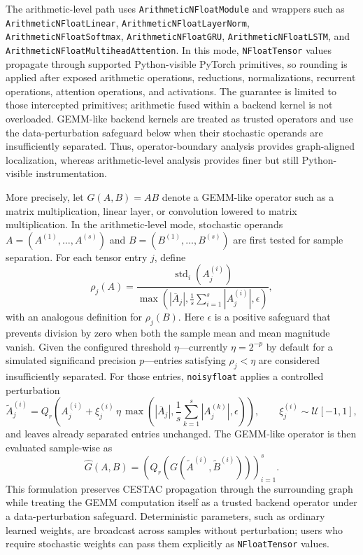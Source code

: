 \documentclass[manuscript, screen]{acmart}
\begin{document}
The arithmetic-level path uses \texttt{ArithmeticNFloatModule} and wrappers such as \texttt{ArithmeticNFloatLinear}, \texttt{ArithmeticNFloatLayerNorm}, \texttt{ArithmeticNFloatSoftmax}, \texttt{ArithmeticNFloatGRU}, \texttt{ArithmeticNFloatLSTM}, and \texttt{ArithmeticNFloatMultiheadAttention}. In this mode, \texttt{NFloatTensor} values propagate through supported Python-visible PyTorch primitives, so rounding is applied after exposed arithmetic operations, reductions, normalizations, recurrent operations, attention operations, and activations. The guarantee is limited to those intercepted primitives; arithmetic fused within a backend kernel is not overloaded. GEMM-like backend kernels are treated as trusted operators and use the data-perturbation safeguard below when their stochastic operands are insufficiently separated. Thus, operator-boundary analysis provides graph-aligned localization, whereas arithmetic-level analysis provides finer but still Python-visible instrumentation.

More precisely, let $G(A,B)=AB$ denote a GEMM-like operator such as a matrix multiplication, linear layer, or convolution lowered to matrix multiplication. In the arithmetic-level mode, stochastic operands $A=(A^{(1)},\ldots,A^{(s)})$ and $B=(B^{(1)},\ldots,B^{(s)})$ are first tested for sample separation. For each tensor entry $j$, define
\begin{equation}
\rho_j(A)=
\frac{\operatorname{std}_{i}\!
\left(A^{(i)}_j\right)}
{\max\!\left(|\overline{A}_j|,
\frac{1}{s}\sum_{i=1}^{s}|A^{(i)}_j|,\epsilon\right)},
\label{eq:gemm_sample_separation}
\end{equation}
with an analogous definition for $\rho_j(B)$. Here $\epsilon$ is a positive safeguard that prevents division by zero when both the sample mean and mean magnitude vanish. Given the configured threshold $\eta$---currently $\eta=2^{-p}$ by default for a simulated significand precision $p$---entries satisfying $\rho_j<\eta$ are considered insufficiently separated. For those entries, \texttt{noisyfloat} applies a controlled perturbation
\begin{equation}
\widetilde{A}^{(i)}_j =
Q_r\!\left(A^{(i)}_j + \xi^{(i)}_j\,\eta\,
\max\!\left(|\overline{A}_j|,
\frac{1}{s}\sum_{k=1}^{s}|A^{(k)}_j|,\epsilon\right)\right),
\qquad
\xi^{(i)}_j\sim\mathcal{U}[-1,1],
\label{eq:gemm_data_perturbation}
\end{equation}
and leaves already separated entries unchanged. The GEMM-like operator is then evaluated sample-wise as
\begin{equation}
\widehat{G}(A,B)=
\left(Q_r\!\left(G(\widetilde{A}^{(i)},\widetilde{B}^{(i)})\right)\right)_{i=1}^{s}.
\label{eq:gemm_lifted_perturbed}
\end{equation}
This formulation preserves CESTAC propagation through the surrounding graph while treating the GEMM computation itself as a trusted backend operator under a data-perturbation safeguard. Deterministic parameters, such as ordinary learned weights, are broadcast across samples without perturbation; users who require stochastic weights can pass them explicitly as \texttt{NFloatTensor} values.
\end{document}
